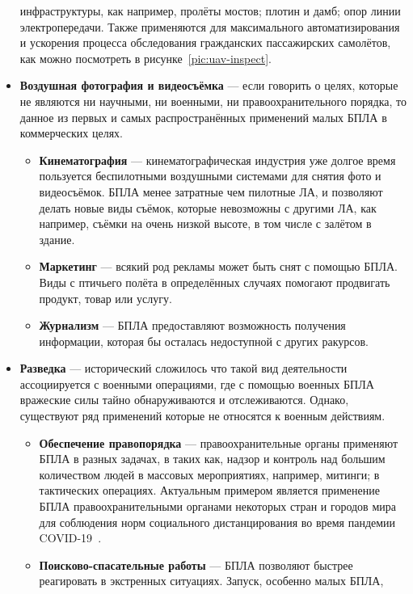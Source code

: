 \documentclass[specification,annotation]{itmo-student-thesis}
\begin{document}
\begin{itemize}
    инфраструктуры, как например, пролёты мостов; плотин и дамб; опор линии
    электропередачи. Также применяются для максимального автоматизирования и
    ускорения процесса обследования гражданских пассажирских самолётов, как
    можно посмотреть в рисунке~\ref{pic:uav-inspect}.
  \item \textbf{Воздушная фотография и видеосъёмка} --- если говорить о целях,
    которые не являются ни научными, ни военными, ни правоохранительного
    порядка, то данное из первых и самых распространённых применений малых БПЛА
    в коммерческих целях.
    \begin{itemize}
      \item \textbf{Кинематография} --- кинематографическая индустрия уже долгое
        время пользуется беспилотными воздушными системами для снятия фото и
        видеосъёмок. БПЛА менее затратные чем пилотные ЛА, и позволяют делать
        новые виды съёмок, которые невозможны с другими ЛА, как например, съёмки
        на очень низкой высоте, в том числе с залётом в здание.
      \item \textbf{Маркетинг} --- всякий род рекламы может быть снят с помощью
        БПЛА. Виды с птичьего полёта в определённых случаях помогают продвигать
        продукт, товар или услугу.
      \item \textbf{Журнализм} --- БПЛА предоставляют возможность получения
        информации, которая бы осталась недоступной с других ракурсов.
    \end{itemize}
  \item \textbf{Разведка} --- исторический сложилось что такой вид деятельности
    ассоциируется с военными операциями, где с помощью военных БПЛА вражеские
    силы тайно обнаруживаются и отслеживаются. Однако, существуют ряд применений
    которые не относятся к военным действиям.
    \begin{itemize}
      \item \textbf{Обеспечение правопорядка} --- правоохранительные органы
        применяют БПЛА в разных задачах, в таких как, надзор и контроль над
        большим количеством людей в массовых мероприятиях, например, митинги; в
        тактических операциях. Актуальным примером является применение БПЛА
        правоохранительными органами некоторых стран и городов мира для
        соблюдения норм социального дистанцирования во время пандемии
        COVID-19~\cite{usatoday-covid}.
      \item \textbf{Поисково-спасательные работы} --- БПЛА позволяют быстрее
        реагировать в экстренных ситуациях. Запуск, особенно малых БПЛА,

\end{itemize}
\end{itemize}
\end{document}
